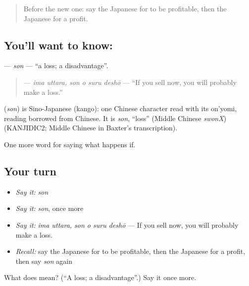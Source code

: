 \label{lesson:JA-C361-son}



\begin{quote}
Before the new one: say the Japanese for to be profitable, then the Japanese for a profit.
\end{quote}

\subsection*{You'll want to know: }
\textbf{} — \emph{son} — \textquotedblleft{}a loss; a disadvantage\textquotedblright{}.

\begin{quote}
\textbf{  } — \emph{ima uttara, son o suru deshō} — \textquotedblleft{}If you sell now, you will probably make a loss.\textquotedblright{}
\end{quote}

\begin{cousinweb}
\textbf{} (\emph{son}) is Sino-Japanese (kango): one Chinese character read with its on'yomi, reading borrowed from Chinese. It is \emph{son}, \textquotedblleft{}loss\textquotedblright{} (Middle Chinese \emph{swonX}) (KANJIDIC2; Middle Chinese in Baxter's transcription).
\end{cousinweb}

\begin{grammarlens}[title={What you've built}]
One more word for saying what happens if.
\end{grammarlens}

\subsection*{Your turn}
\begin{itemize}
\raggedright
  \item \emph{Say it:} \emph{son}
  \item \emph{Say it:} \emph{son}, once more
  \item \emph{Say it:} \emph{ima uttara, son o suru deshō} — If you sell now, you will probably make a loss.
  \item \emph{Recall:} say the Japanese for to be profitable, then the Japanese for a profit, then say \emph{son} again
\end{itemize}

\begin{tcolorbox}[breakable,colback=teal!4,colframe=teal!35!black,title={Before you move on}]
What does  mean? (\textquotedblleft{}A loss; a disadvantage\textquotedblright{}.) Say it once more.
\end{tcolorbox}
